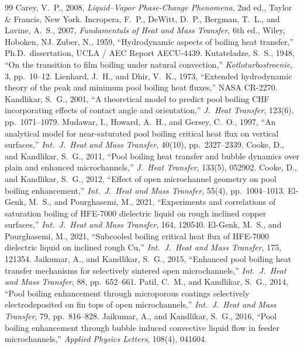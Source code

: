 \documentclass[11pt]{article}
\begin{document}
\begin{thebibliography}{99}
 Carey, V.~P., 2008, \textit{Liquid--Vapor Phase-Change Phenomena}, 2nd ed., Taylor \& Francis, New York.
 Incropera, F.~P., DeWitt, D.~P., Bergman, T.~L., and Lavine, A.~S., 2007, \textit{Fundamentals of Heat and Mass Transfer}, 6th ed., Wiley, Hoboken, NJ.
 Zuber, N., 1959, ``Hydrodynamic aspects of boiling heat transfer,'' Ph.D.\ dissertation, UCLA / AEC Report AECU-4439.
 Kutateladze, S.~S., 1948, ``On the transition to film boiling under natural convection,'' \textit{Kotloturbostroenie}, 3, pp.~10--12.
 Lienhard, J.~H., and Dhir, V.~K., 1973, ``Extended hydrodynamic theory of the peak and minimum pool boiling heat fluxes,'' NASA CR-2270.
 Kandlikar, S.~G., 2001, ``A theoretical model to predict pool boiling CHF incorporating effects of contact angle and orientation,'' \textit{J.\ Heat Transfer}, 123(6), pp.~1071--1079.
 Mudawar, I., Howard, A.~H., and Gersey, C.~O., 1997, ``An analytical model for near-saturated pool boiling critical heat flux on vertical surfaces,'' \textit{Int.\ J.\ Heat and Mass Transfer}, 40(10), pp.~2327--2339.
 Cooke, D., and Kandlikar, S.~G., 2011, ``Pool boiling heat transfer and bubble dynamics over plain and enhanced microchannels,'' \textit{J.\ Heat Transfer}, 133(5), 052902.
 Cooke, D., and Kandlikar, S.~G., 2012, ``Effect of open microchannel geometry on pool boiling enhancement,'' \textit{Int.\ J.\ Heat and Mass Transfer}, 55(4), pp.~1004--1013.
 El-Genk, M.~S., and Pourghasemi, M., 2021, ``Experiments and correlations of saturation boiling of HFE-7000 dielectric liquid on rough inclined copper surfaces,'' \textit{Int.\ J.\ Heat and Mass Transfer}, 164, 120540.
 El-Genk, M.~S., and Pourghasemi, M., 2021, ``Subcooled boiling critical heat flux of HFE-7000 dielectric liquid on inclined rough Cu,'' \textit{Int.\ J.\ Heat and Mass Transfer}, 175, 121354.
 Jaikumar, A., and Kandlikar, S.~G., 2015, ``Enhanced pool boiling heat transfer mechanisms for selectively sintered open microchannels,'' \textit{Int.\ J.\ Heat and Mass Transfer}, 88, pp.~652--661.
 Patil, C.~M., and Kandlikar, S.~G., 2014, ``Pool boiling enhancement through microporous coatings selectively electrodeposited on fin tops of open microchannels,'' \textit{Int.\ J.\ Heat and Mass Transfer}, 79, pp.~816--828.
 Jaikumar, A., and Kandlikar, S.~G., 2016, ``Pool boiling enhancement through bubble induced convective liquid flow in feeder microchannels,'' \textit{Applied Physics Letters}, 108(4), 041604.

\end{thebibliography}
\end{document}
